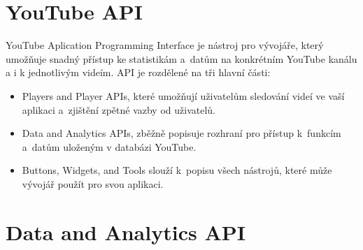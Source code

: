 \section{YouTube API}
\par YouTube Aplication Programming Interface\cite{apistart} je nástroj pro vývojáře, který umožňuje snadný přístup ke statistikám a~datům na konkrétním YouTube kanálu a i k jednotlivým videím. API je rozdělené na tři hlavní části:
\begin{itemize}
	\item{Players and Player APIs, které umožňují uživatelům sledování videí ve vaší aplikaci a~zjištění zpětné vazby od uživatelů.}
	\item{Data and Analytics APIs, zběžně popisuje rozhraní pro přístup k~funkcím a~datům uloženým v databázi YouTube.}
	\item{Buttons, Widgets, and Tools slouží k~popisu všech nástrojů, které může vývojář použít pro svou aplikaci.}
\end{itemize}

\section{Data and Analytics API}
